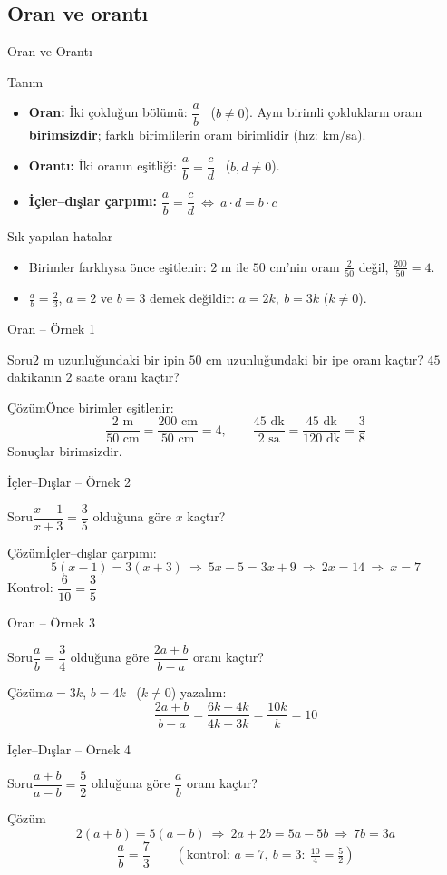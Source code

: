 \documentclass[aspectratio=169,11pt,handout]{beamer}
\newcommand{\soru}[3]{%
\begin{frame}{#1}
  \begin{block}{Soru}\large #2\end{block}
  \pause
  \begin{exampleblock}{Çözüm}\large #3\end{exampleblock}
\end{frame}}
\begin{document}
\subsection{Oran ve orantı}
\begin{frame}{Oran ve Orantı}
\begin{block}{Tanım}
\begin{itemize}
\item \textbf{Oran:} İki çokluğun bölümü: \(\dfrac{a}{b}\) \ (\(b\neq 0\)). Aynı birimli çoklukların oranı \textbf{birimsizdir}; farklı birimlilerin oranı birimlidir (hız: km/sa).
\item \textbf{Orantı:} İki oranın eşitliği: \(\dfrac{a}{b}=\dfrac{c}{d}\) \ (\(b,d\neq 0\)).
\item \textbf{İçler--dışlar çarpımı:} \(\dfrac{a}{b}=\dfrac{c}{d}\ \Longleftrightarrow\ a\cdot d=b\cdot c\)
\end{itemize}
\end{block}
\begin{alertblock}{Sık yapılan hatalar}
\begin{itemize}
\item Birimler farklıysa önce eşitlenir: \(2\) m ile \(50\) cm'nin oranı \(\frac{2}{50}\) değil, \(\frac{200}{50}=4\).
\item \(\frac{a}{b}=\frac{2}{3}\), \(a=2\) ve \(b=3\) demek değildir: \(a=2k,\ b=3k\) (\(k\neq 0\)).
\end{itemize}
\end{alertblock}
\end{frame}

\soru{Oran -- Örnek 1}
{\(2\) m uzunluğundaki bir ipin \(50\) cm uzunluğundaki bir ipe oranı kaçtır? \(45\) dakikanın \(2\) saate oranı kaçtır?}
{Önce birimler eşitlenir:
\[\frac{2\text{ m}}{50\text{ cm}}=\frac{200\text{ cm}}{50\text{ cm}}=4,\qquad \frac{45\text{ dk}}{2\text{ sa}}=\frac{45\text{ dk}}{120\text{ dk}}=\frac{3}{8}\]
Sonuçlar birimsizdir.}

\soru{İçler--Dışlar -- Örnek 2}
{\(\dfrac{x-1}{x+3}=\dfrac{3}{5}\) olduğuna göre \(x\) kaçtır?}
{İçler--dışlar çarpımı:
\[5(x-1)=3(x+3)\ \Rightarrow\ 5x-5=3x+9\ \Rightarrow\ 2x=14\ \Rightarrow\ x=7\]
Kontrol: \(\dfrac{6}{10}=\dfrac{3}{5}\) \checkmark}

\soru{Oran -- Örnek 3}
{\(\dfrac{a}{b}=\dfrac{3}{4}\) olduğuna göre \(\dfrac{2a+b}{b-a}\) oranı kaçtır?}
{\(a=3k\), \(b=4k\) \ (\(k\neq 0\)) yazalım:
\[\frac{2a+b}{b-a}=\frac{6k+4k}{4k-3k}=\frac{10k}{k}=10\]}

\soru{İçler--Dışlar -- Örnek 4}
{\(\dfrac{a+b}{a-b}=\dfrac{5}{2}\) olduğuna göre \(\dfrac{a}{b}\) oranı kaçtır?}
{\[2(a+b)=5(a-b)\ \Rightarrow\ 2a+2b=5a-5b\ \Rightarrow\ 7b=3a\]
\[\frac{a}{b}=\frac{7}{3}\qquad(\text{kontrol: } a=7,\ b=3:\ \tfrac{10}{4}=\tfrac{5}{2})\]}
\end{document}
